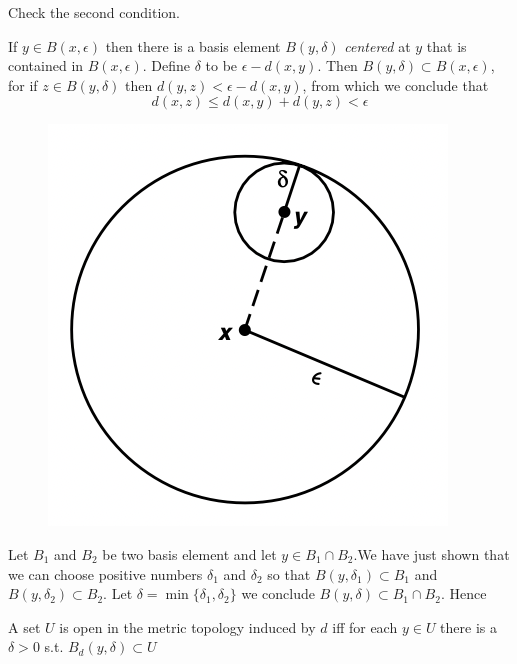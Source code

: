 \documentclass[11pt]{article}
\begin{document}
Check the second condition.

If \(y\in B(x,\epsilon)\) then there is a basis element \(B(y,\delta)\) \emph{centered} at \(y\) that is contained
in \(B(x,\epsilon)\). Define \(\delta\) to be \(\epsilon-d(x,y)\). Then \(B(y,\delta)\subset B(x,\epsilon)\), for if \(z\in B(y,\delta)\)
then \(d(y,z)<\epsilon-d(x,y)\), from which we conclude that
\begin{equation*}
d(x,z)\le d(x,y)+d(y,z)<\epsilon
\end{equation*}

\begin{figure}[htbp]
\centering
\includegraphics[width=.4\textwidth]{../images/Topology/4.png}
\label{}
\end{figure}

Let \(B_1\) and \(B_2\) be two basis element and let \(y\in B_1\cap B_2\).We have just shown that we can
choose positive numbers \(\delta_1\) and \(\delta_2\) so that \(B(y,\delta_1)\subset B_1\) and \(B(y,\delta_2)\subset B_2\).
Let \(\delta=\min\{\delta_1,\delta_2\}\) we conclude \(B(y,\delta)\subset B_1\cap B_2\). Hence
\begin{quoting}
A set \(U\) is open in the metric topology induced by \(d\) iff for each \(y\in U\) there is
a \(\delta>0\) s.t. \(B_d(y,\delta)\subset U\)
\end{quoting}
\end{document}
